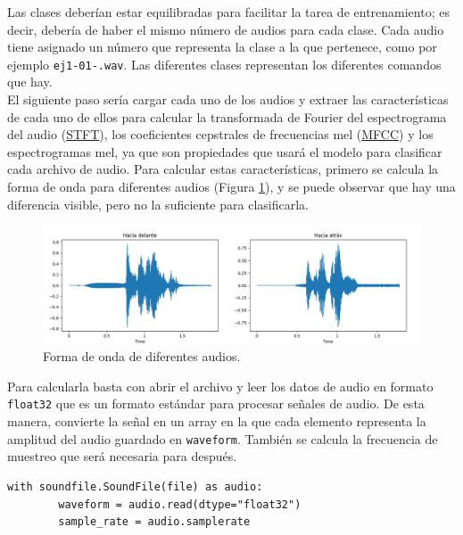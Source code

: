 Las clases deberían estar equilibradas para facilitar la tarea de entrenamiento; es decir, debería de haber el mismo número de audios para cada clase. Cada audio tiene asignado un número que representa la clase a la que pertenece, como por ejemplo \texttt{ej1-01-.wav}. Las diferentes clases representan los diferentes comandos que hay.\\


 El siguiente paso sería cargar cada uno de los audios y extraer las características de cada uno de ellos para calcular la transformada de Fourier del espectrograma del audio (\hyperlink{STFT}{STFT}), los coeficientes cepstrales de frecuencias mel (\hyperlink{MFCC}{MFCC}) y los espectrogramas mel, ya que son propiedades que usará el modelo para clasificar cada archivo de audio. Para calcular estas características, primero se calcula la forma de onda para diferentes audios (Figura \ref{fig:onda}), y se puede observar que hay una diferencia visible, pero no la suficiente para clasificarla.
 
 \begin{figure}[H]
  \centering
  \includegraphics[scale=0.3]{figs/forma_onda} %
  \caption{ Forma de onda de diferentes audios.}
  \label{fig:onda}
\end{figure}



Para calcularla basta con abrir el archivo y leer los datos de audio en formato \texttt{float32} que es un formato estándar para procesar señales de audio. De esta manera, convierte la señal en un array en la que cada elemento representa la amplitud del audio guardado en \texttt{waveform}. También se calcula la frecuencia de muestreo que será necesaria para después.

\begin{verbatim}
with soundfile.SoundFile(file) as audio:
        waveform = audio.read(dtype="float32")
        sample_rate = audio.samplerate
\end{verbatim}

